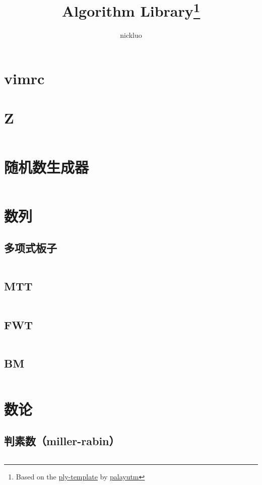 \documentclass[a4paper,9]{article}
\author{nickluo}
\title{Algorithm Library\footnote{Based on the \href{https://github.com/palayutm/ply-template}{ply-template} by \href{https://github.com/palayutm}{palayutm}}}
\begin{document}
\maketitle %
\tableofcontents %

\twocolumn  %

\section{vimrc}

\section{Z}
\inputminted[breaklines]{c++}{Z/z.cpp} %

\section{随机数生成器}
\inputminted[breaklines]{c++}{random/rand_gen.cpp}

\section{数列}
\subsection{多项式板子}
\inputminted[breaklines]{c++}{sequence/polynomial.cpp}
\subsection{MTT}
\inputminted[breaklines]{c++}{sequence/mtt.cpp}
\subsection{FWT}
\inputminted[breaklines]{c++}{sequence/fwt.cpp}
\subsection{BM}
\inputminted[breaklines]{c++}{sequence/bm.cpp}

\section{数论}
\subsection{判素数（miller-rabin）}
\inputminted[breaklines]{c++}{number_theory/miller_rabin.cpp}
\end{document}
